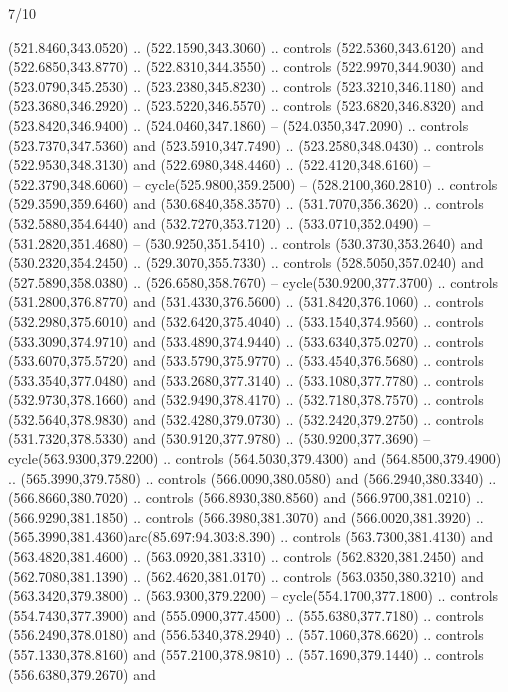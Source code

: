 \begin{flagdescription}{7/10}
\begin{scope}[xshift=0.5\flaglength]
\begin{scope}[scale=0.00185\flagwidth,yshift=245mm,xshift=-43.7mm]
\begin{scope}[y=-0.8pt, x=0.8pt, inner sep=0pt, outer sep=0pt]
\begin{scope}[shift={(0,0)},shift={(0,36.591)}]
\begin{scope}[shift={(-344.0678,183.89831)}]
\begin{scope}[fill=lblue]
  (521.8460,343.0520) .. (522.1590,343.3060) .. controls (522.5360,343.6120) and
  (522.6850,343.8770) .. (522.8310,344.3550) .. controls (522.9970,344.9030) and
  (523.0790,345.2530) .. (523.2380,345.8230) .. controls (523.3210,346.1180) and
  (523.3680,346.2920) .. (523.5220,346.5570) .. controls (523.6820,346.8320) and
  (523.8420,346.9400) .. (524.0460,347.1860) -- (524.0350,347.2090) .. controls
  (523.7370,347.5360) and (523.5910,347.7490) .. (523.2580,348.0430) .. controls
  (522.9530,348.3130) and (522.6980,348.4460) .. (522.4120,348.6160) --
  (522.3790,348.6060) -- cycle(525.9800,359.2500) -- (528.2100,360.2810) ..
  controls (529.3590,359.6460) and (530.6840,358.3570) .. (531.7070,356.3620) ..
  controls (532.5880,354.6440) and (532.7270,353.7120) .. (533.0710,352.0490) --
  (531.2820,351.4680) -- (530.9250,351.5410) .. controls (530.3730,353.2640) and
  (530.2320,354.2450) .. (529.3070,355.7330) .. controls (528.5050,357.0240) and
  (527.5890,358.0380) .. (526.6580,358.7670) -- cycle(530.9200,377.3700) ..
  controls (531.2800,376.8770) and (531.4330,376.5600) .. (531.8420,376.1060) ..
  controls (532.2980,375.6010) and (532.6420,375.4040) .. (533.1540,374.9560) ..
  controls (533.3090,374.9710) and (533.4890,374.9440) .. (533.6340,375.0270) ..
  controls (533.6070,375.5720) and (533.5790,375.9770) .. (533.4540,376.5680) ..
  controls (533.3540,377.0480) and (533.2680,377.3140) .. (533.1080,377.7780) ..
  controls (532.9730,378.1660) and (532.9490,378.4170) .. (532.7180,378.7570) ..
  controls (532.5640,378.9830) and (532.4280,379.0730) .. (532.2420,379.2750) ..
  controls (531.7320,378.5330) and (530.9120,377.9780) .. (530.9200,377.3690) --
  cycle(563.9300,379.2200) .. controls (564.5030,379.4300) and
  (564.8500,379.4900) .. (565.3990,379.7580) .. controls (566.0090,380.0580) and
  (566.2940,380.3340) .. (566.8660,380.7020) .. controls (566.8930,380.8560) and
  (566.9700,381.0210) .. (566.9290,381.1850) .. controls (566.3980,381.3070) and
  (566.0020,381.3920) .. (565.3990,381.4360)arc(85.697:94.303:8.390) .. controls
  (563.7300,381.4130) and (563.4820,381.4600) .. (563.0920,381.3310) .. controls
  (562.8320,381.2450) and (562.7080,381.1390) .. (562.4620,381.0170) .. controls
  (563.0350,380.3210) and (563.3420,379.3800) .. (563.9300,379.2200) --
  cycle(554.1700,377.1800) .. controls (554.7430,377.3900) and
  (555.0900,377.4500) .. (555.6380,377.7180) .. controls (556.2490,378.0180) and
  (556.5340,378.2940) .. (557.1060,378.6620) .. controls (557.1330,378.8160) and
  (557.2100,378.9810) .. (557.1690,379.1440) .. controls (556.6380,379.2670) and

\end{scope}
\end{scope}
\end{scope}
\end{scope}
\end{scope}
\end{scope}
\end{flagdescription}
